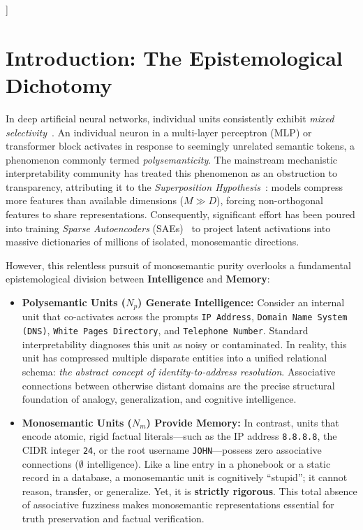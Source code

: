 \documentclass[10pt,twocolumn]{article}
\theoremstyle{definition}
\begin{document}
\begin{@twocolumnfalse}
\begin{abstract}
      \vspace{0.35cm}
    \end{abstract}
  \end{@twocolumnfalse}
]

\section{Introduction: The Epistemological Dichotomy}

In deep artificial neural networks, individual units consistently exhibit \textit{mixed selectivity}~\cite{rigotti2013importance, elhage2022toy}. An individual neuron in a multi-layer perceptron (MLP) or transformer block activates in response to seemingly unrelated semantic tokens, a phenomenon commonly termed \textit{polysemanticity}. The mainstream mechanistic interpretability community has treated this phenomenon as an obstruction to transparency, attributing it to the \textit{Superposition Hypothesis}~\cite{elhage2022toy}: models compress more features than available dimensions ($M \gg D$), forcing non-orthogonal features to share representations. Consequently, significant effort has been poured into training \textit{Sparse Autoencoders} (SAEs)~\cite{bricken2023monosemanticity, templeton2024scaling, cunningham2023sparse} to project latent activations into massive dictionaries of millions of isolated, monosemantic directions.

However, this relentless pursuit of monosemantic purity overlooks a fundamental epistemological division between \textbf{Intelligence} and \textbf{Memory}:
\begin{itemize}[leftmargin=*, itemsep=2.0pt, topsep=2.5pt]
    \item \textbf{Polysemantic Units ($N_p$) Generate Intelligence:} Consider an internal unit that co-activates across the prompts \texttt{IP Address}, \texttt{Domain Name System (DNS)}, \texttt{White Pages Directory}, and \texttt{Telephone Number}. Standard interpretability diagnoses this unit as noisy or contaminated. In reality, this unit has compressed multiple disparate entities into a unified relational schema: \textit{the abstract concept of identity-to-address resolution}. Associative connections between otherwise distant domains are the precise structural foundation of analogy, generalization, and cognitive intelligence.
    \item \textbf{Monosemantic Units ($N_m$) Provide Memory:} In contrast, units that encode atomic, rigid factual literals---such as the IP address \texttt{8.8.8.8}, the CIDR integer \texttt{24}, or the root username \texttt{JOHN}---possess zero associative connections ($\emptyset$ intelligence). Like a line entry in a phonebook or a static record in a database, a monosemantic unit is cognitively ``stupid''; it cannot reason, transfer, or generalize. Yet, it is \textbf{strictly rigorous}. This total absence of associative fuzziness makes monosemantic representations essential for truth preservation and factual verification.
\end{itemize}
\end{document}

